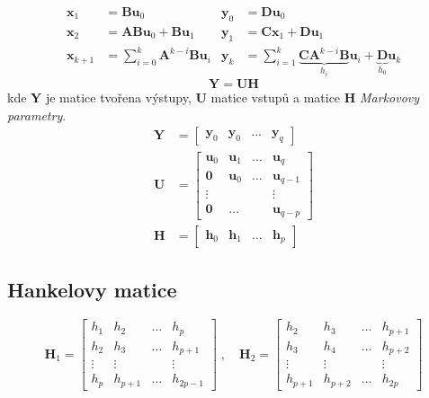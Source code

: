 \documentclass{article}
\begin{document}
	\begin{align}
		\bm{x}_1 &= \bm{B} \bm{u}_0 & \bm{y}_0 &= \bm{D}\bm{u}_0 \\
		\bm{x}_2 &= \bm{A}\bm{B} \bm{u}_0 + \bm{B} \bm{u}_1 & \bm{y}_1 &= \bm{C}\bm{x}_1 + \bm{D} \bm{u}_1 \\
		\bm{x}_{k+1} &= \sum_{i=0}^{k} \bm{A}^{k-i} \bm{B} \bm{u}_i & \bm{y}_{k} &= \sum_{i=1}^k \underbrace{\bm{C} \bm{A}^{k-i} \bm{B}}_{h_i} \bm{u}_i + \underbrace{\bm{D}}_{h_0} \bm{u}_k 
	\end{align}
	\begin{equation}
		\bm{Y} = \bm{U} \bm{H}
	\end{equation}
	kde $\bm{Y}$ je matice tvořena výstupy, $\bm{U}$ matice vstupů a matice $\bm{H}$ \emph{Markovovy parametry}.
	\begin{align}
		\bm{Y}
		&=
		\begin{bmatrix}
			\bm{y}_0 & \bm{y}_0 & \dots & \bm{y}_q
		\end{bmatrix}
		\\
		\bm{U}
		&=
		\begin{bmatrix}
			\bm{u}_0 & \bm{u}_1 & \dots & \bm{u}_q \\
			\bm{0} & \bm{u}_0 & \dots & \bm{u}_{q-1} \\
			\vdots & & & \vdots \\
			\bm{0} & \dots & & \bm{u}_{q-p} 
		\end{bmatrix}
		\\
		\bm{H}
		&=
		\begin{bmatrix}
			\bm{h}_0 & \bm{h}_1 & \dots & \bm{h}_p
		\end{bmatrix}
	\end{align}

	\subsection{Hankelovy matice}
	\begin{equation}
		\bm{H}_1
		=
		\begin{bmatrix}
			h_1 & h_2 & \dots & h_p \\
			h_2 & h_3 & \dots & h_{p+1} \\
			\vdots & \vdots & & \vdots \\
			h_p & h_{p+1} & \dots & h_{2p-1}
		\end{bmatrix}
		\;,\quad 
		\bm{H}_2
		=
		\begin{bmatrix}
			h_2 & h_3 & \dots & h_{p+1} \\
			h_3 & h_4 & \dots & h_{p+2} \\
			\vdots & \vdots & & \vdots \\
			h_{p+1} & h_{p+2} & \dots & h_{2p}
		\end{bmatrix}
	\end{equation}
\end{document}
